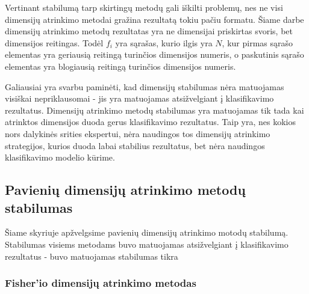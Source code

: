 Vertinant stabilumą tarp skirtingų metodų gali iškilti problemų, nes ne visi 
dimensijų atrinkimo metodai gražina rezultatą tokiu pačiu formatu. Šiame darbe
dimensijų atrinkimo metodų rezultatas yra ne dimensijai priskirtas svoris, bet 
dimensijos reitingas. Todėl $f_i$ yra sąrašas, kurio ilgis yra $N$, kur pirmas
sąrašo elementas yra geriausią reitingą turinčios dimensijos numeris, o 
paskutinis sąrašo elementas yra blogiausią reitingą turinčios dimensijos numeris.

Galiausiai yra svarbu paminėti, kad dimensijų stabilumas nėra matuojamas
visiškai nepriklausomai - jis yra matuojamas atsižvelgiant į klasifikavimo
rezultatus. Dimensijų atrinkimo metodų stabilumas yra matuojamas tik tada
kai atrinktos dimensijos duoda gerus klasifikavimo rezultatus. Taip yra, nes 
kokios nors dalykinės srities ekspertui, nėra naudingos tos dimensijų atrinkimo
strategijos, kurios duoda labai stabilius rezultatus, bet nėra naudingos
klasifikavimo modelio kūrime.

\subsection{Pavienių dimensijų atrinkimo metodų stabilumas}

Šiame skyriuje apžvelgsime pavienių dimensijų atrinkimo motodų stabilumą. 
Stabilumas visiems metodams buvo matuojamas atsižvelgiant į klasifikavimo
rezultatus - buvo matuojamas stabilumas tikra

\subsubsection{Fisher'io dimensijų atrinkimo metodas}
